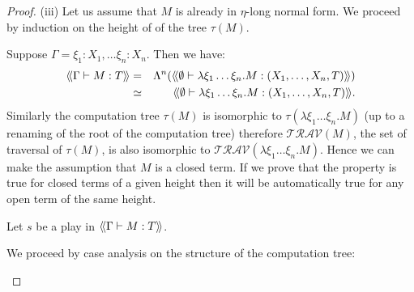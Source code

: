 \begin{proof}
(iii) Let us assume that $M$ is already in $\eta$-long normal form.
We proceed by induction on the height of of the tree $\tau(M)$.

Suppose $\Gamma = \xi_1:X_1,\ldots \xi_n:X_n$.
Then we have:
\begin{eqnarray*}
{\langle\!\langle \Gamma \vdash M:T \rangle\!\rangle} &=& \Lambda^n( {\langle\!\langle \emptyset \vdash \lambda \xi_1\ldots \xi_n . M: (X_1,\ldots,X_n,T)  \rangle\!\rangle} ) \\
        &\simeq& {\langle\!\langle \emptyset \vdash \lambda \xi_1\ldots \xi_n . M: (X_1,\ldots,X_n,T)  \rangle\!\rangle}.
\end{eqnarray*}
Similarly the computation tree $\tau(M)$ is isomorphic to
$\tau(\lambda \xi_1\ldots \xi_n . M)$ (up to a renaming of the root of the computation tree) therefore
$\mathcal{TRAV}(M)$, the set of traversal of $\tau(M)$, is also isomorphic to $\mathcal{TRAV}(\lambda \xi_1\ldots \xi_n . M)$.
Hence we can make the assumption that $M$ is a closed term. If we prove that the property is true for
closed terms of a given height then it will be automatically true for any open term of the same height.

Let $s$ be a play in ${\langle\!\langle \Gamma \vdash M:T \rangle\!\rangle}$.

We proceed by case analysis on the structure of the computation tree:
\begin{itemize}

%
%
%


\end{itemize}
\end{proof}
